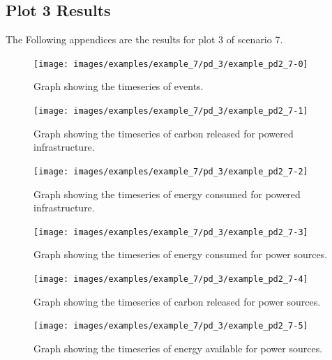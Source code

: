 \documentclass{l4proj}
\begin{document}
\begin{appendices}
\subsection{Plot 3 Results}\label{apen:subsec:scen7plot3}
The Following appendices are the results for plot 3 of scenario 7.
\clearpage
\begin{figure}[htbp]
    \centering
    \texttt{[image: images/examples/example\_7/pd\_3/example\_pd2\_7-0]}
    ~
    \caption{Graph showing the timeseries of events.}
    \label{fig:example_pd2_7-0}
\end{figure}
    \clearpage
\begin{figure}[htbp]
    \centering
    \texttt{[image: images/examples/example\_7/pd\_3/example\_pd2\_7-1]}
    ~
    \caption{Graph showing the timeseries of carbon released for powered infrastructure.}
    \label{fig:example_pd2_7-1}
\end{figure}
    \clearpage
\begin{figure}[htbp]
    \centering
    \texttt{[image: images/examples/example\_7/pd\_3/example\_pd2\_7-2]}
    ~
    \caption{Graph showing the timeseries of energy consumed for powered infrastructure.}
    \label{fig:example_pd2_7-2}
\end{figure}
    \clearpage
\begin{figure}[htbp]
    \centering
    \texttt{[image: images/examples/example\_7/pd\_3/example\_pd2\_7-3]}
    ~
    \caption{Graph showing the timeseries of energy consumed for power sources.}
    \label{fig:example_pd2_7-3}
\end{figure}
    \clearpage
\begin{figure}[htbp]
    \centering
    \texttt{[image: images/examples/example\_7/pd\_3/example\_pd2\_7-4]}
    ~
    \caption{Graph showing the timeseries of carbon released for power sources.}
    \label{fig:example_pd2_7-4}
\end{figure}
    \clearpage
\begin{figure}[htbp]
    \centering
    \texttt{[image: images/examples/example\_7/pd\_3/example\_pd2\_7-5]}
    ~
    \caption{Graph showing the timeseries of energy available for power sources.}
    \label{fig:example_pd2_7-5}
\end{figure}
\end{appendices}


\clearpage
\end{document}

